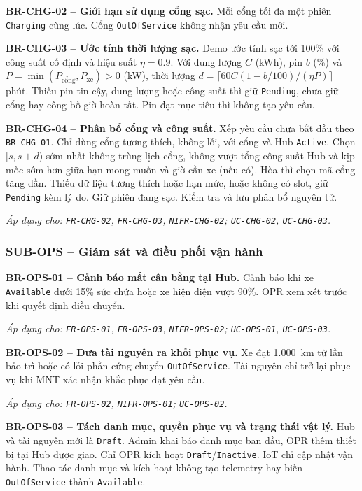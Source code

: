 \medskip
\noindent\textbf{BR-CHG-02 -- Giới hạn sử dụng cổng sạc.} Mỗi cổng tối đa một phiên \texttt{Charging} cùng lúc. Cổng \texttt{OutOfService} không nhận yêu cầu mới.

\medskip
\noindent\textbf{BR-CHG-03 -- Ước tính thời lượng sạc.} Demo ước tính sạc tới 100\% với công suất cố định và hiệu suất $\eta=0.9$. Với dung lượng $C$ (kWh), pin $b$ (\%) và $P=\min(P_{\text{cổng}},P_{\text{xe}})>0$ (kW), thời lượng $d=\lceil60C(1-b/100)/(\eta P)\rceil$ phút. Thiếu pin tin cậy, dung lượng hoặc công suất thì giữ \texttt{Pending}, chưa giữ cổng hay công bố giờ hoàn tất. Pin đạt mục tiêu thì không tạo yêu cầu.

\medskip
\noindent\textbf{BR-CHG-04 -- Phân bổ cổng và công suất.} Xếp yêu cầu chưa bắt đầu theo \texttt{BR-CHG-01}. Chỉ dùng cổng tương thích, không lỗi, với cổng và Hub \texttt{Active}. Chọn $[s,s+d)$ sớm nhất không trùng lịch cổng, không vượt tổng công suất Hub và kịp mốc sớm hơn giữa hạn mong muốn và giờ cần xe (nếu có). Hòa thì chọn mã cổng tăng dần. Thiếu dữ liệu tương thích hoặc hạn mức, hoặc không có slot, giữ \texttt{Pending} kèm lý do. Giữ phiên đang sạc. Kiểm tra và lưu phân bổ nguyên tử.

\textit{Áp dụng cho: \texttt{FR-CHG-02}, \texttt{FR-CHG-03}, \texttt{NIFR-CHG-02}; \texttt{UC-CHG-02}, \texttt{UC-CHG-03}.}

\subsubsection{SUB-OPS -- Giám sát và điều phối vận hành}

\noindent\textbf{BR-OPS-01 -- Cảnh báo mất cân bằng tại Hub.} Cảnh báo khi xe \texttt{Available} dưới 15\% sức chứa hoặc xe hiện diện vượt 90\%. OPR xem xét trước khi quyết định điều chuyển.

\textit{Áp dụng cho: \texttt{FR-OPS-01}, \texttt{FR-OPS-03}, \texttt{NIFR-OPS-02}; \texttt{UC-OPS-01}, \texttt{UC-OPS-03}.}

\medskip
\noindent\textbf{BR-OPS-02 -- Đưa tài nguyên ra khỏi phục vụ.} Xe đạt 1.000~km từ lần bảo trì hoặc có lỗi phần cứng chuyển \texttt{OutOfService}. Tài nguyên chỉ trở lại phục vụ khi MNT xác nhận khắc phục đạt yêu cầu.

\textit{Áp dụng cho: \texttt{FR-OPS-02}, \texttt{NIFR-OPS-01}; \texttt{UC-OPS-02}.}

\medskip
\noindent\textbf{BR-OPS-03 -- Tách danh mục, quyền phục vụ và trạng thái vật lý.} Hub và tài nguyên mới là \texttt{Draft}. Admin khai báo danh mục ban đầu, OPR thêm thiết bị tại Hub được giao. Chỉ OPR kích hoạt \texttt{Draft}/\texttt{Inactive}. IoT chỉ cập nhật vận hành. Thao tác danh mục và kích hoạt không tạo telemetry hay biến \texttt{OutOfService} thành \texttt{Available}.

